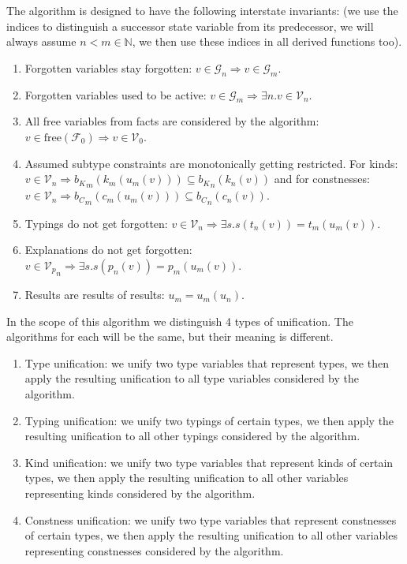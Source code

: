 \begin{defn}
    The algorithm is designed to have the following interstate invariants: (we use the indices to distinguish a successor state variable from its predecessor, we will always assume $n < m \in \mathbb{N}$, we then use these indices in all derived functions too).

    \begin{enumerate}
        \item Forgotten variables stay forgotten: $v \in \mathcal{G}_n \Rightarrow v \in \mathcal{G}_m$.
        \item Forgotten variables used to be active: $v \in \mathcal{G}_m \Rightarrow \exists n . v \in \mathcal{V}_n$.
        \item All free variables from facts are considered by the algorithm: $v \in \mathrm{free} (\mathcal{F}_0) \Rightarrow v \in \mathcal{V}_0$.
        \item Assumed subtype constraints are monotonically getting restricted. For kinds: $v \in {\mathcal{V}}_n \Rightarrow {b_K}_m (k_m(u_m(v))) \subseteq {b_K}_n (k_n(v))$ and for constnesses: $v \in {\mathcal{V}}_n \Rightarrow {b_C}_m (c_m(u_m(v))) \subseteq {b_C}_n (c_n(v))$.
        \item Typings do not get forgotten: $v \in {\mathcal{V}}_n \Rightarrow \exists s . s(t_n(v)) = t_m(u_m (v))$.
        \item Explanations do not get forgotten: $v \in {\mathcal{V}_p}_n \Rightarrow \exists s . s(p_n(v)) = p_m(u_m (v))$.
        \item Results are results of results: $u_m = u_m (u_n)$.
    \end{enumerate}
\end{defn}

\begin{defn}[Unifications]
    In the scope of this algorithm we distinguish 4 types of unification. The algorithms for each will be the same, but their meaning is different.

    \begin{enumerate}
        \item Type unification: we unify two type variables that represent types, we then apply the resulting unification to all type variables considered by the algorithm. \label{tUni}
        \item Typing unification: we unify two typings of certain types, we then apply the resulting unification to all other typings considered by the algorithm.
        \item Kind unification: we unify two type variables that represent kinds of certain types, we then apply the resulting unification to all other variables representing kinds considered by the algorithm. \label{kUni}
        \item Constness unification: we unify two type variables that represent constnesses of certain types, we then apply the resulting unification to all other variables representing constnesses considered by the algorithm. \label{cUni} 
    \end{enumerate}
\end{defn}

